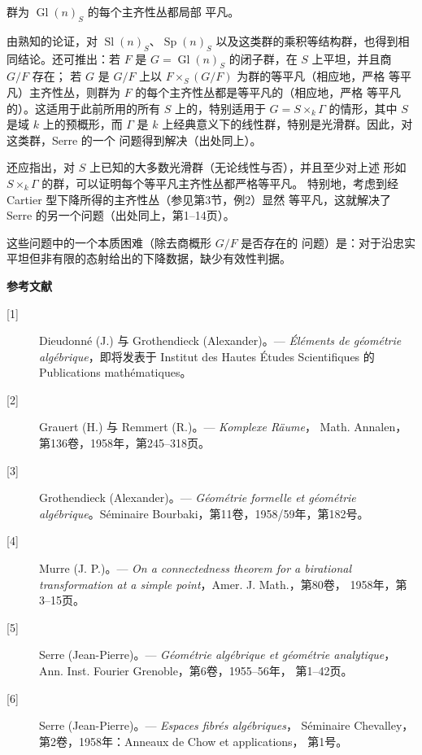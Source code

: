  群为 $\operatorname{Gl}(n)_S$ 的每个主齐性丛都局部
平凡。

由熟知的论证，对 $\operatorname{Sl}(n)_S$、$\operatorname{Sp}(n)_S$
以及这类群的乘积等结构群，也得到相同结论。还可推出：若 $F$ 是
$G=\operatorname{Gl}(n)_S$ 的闭子群，在 $S$ 上平坦，并且商 $G/F$ 存在；
若 $G$ 是 $G/F$ 上以 $F\times_S(G/F)$ 为群的等平凡（相应地，严格
等平凡）主齐性丛，则群为 $F$ 的每个主齐性丛都是等平凡的（相应地，严格
等平凡的）。这适用于此前所用的所有 $S$ 上的，特别适用于
$G=S\times_k\Gamma$ 的情形，其中 $S$ 是域 $k$ 上的预概形，而 $\Gamma$
是 $k$ 上经典意义下的线性群，特别是光滑群。因此，对这类群，Serre 的一个
问题得到解决（出处同上）。

还应指出，对 $S$ 上已知的大多数光滑群（无论线性与否），并且至少对上述
形如 $S\times_k\Gamma$ 的群，可以证明每个等平凡主齐性丛都严格等平凡。
特别地，考虑到经 Cartier 型下降所得的主齐性丛（参见第3节，例2）显然
等平凡，这就解决了 Serre 的另一个问题（出处同上，第1--14页）。

 这些问题中的一个本质困难（除去商概形 $G/F$ 是否存在的
问题）是：对于沿忠实平坦但非有限的态射给出的下降数据，缺少有效性判据。

\begin{center}
  \textbf{参考文献}
\end{center}

\begin{description}
  \item[{[1]}] Dieudonné (J.) 与 Grothendieck (Alexander)。---
    \emph{Éléments de géométrie algébrique}，即将发表于 Institut des
    Hautes Études Scientifiques 的 Publications mathématiques。
  \item[{[2]}] Grauert (H.) 与 Remmert (R.)。--- \emph{Komplexe Räume}，
    Math. Annalen，第136卷，1958年，第245--318页。
  \item[{[3]}] Grothendieck (Alexander)。--- \emph{Géométrie formelle et
    géométrie algébrique}。Séminaire Bourbaki，第11卷，1958/59年，第182号。
  \item[{[4]}] Murre (J. P.)。--- \emph{On a connectedness theorem for a
    birational transformation at a simple point}，Amer. J. Math.，第80卷，
    1958年，第3--15页。
  \item[{[5]}] Serre (Jean-Pierre)。--- \emph{Géométrie algébrique et
    géométrie analytique}，Ann. Inst. Fourier Grenoble，第6卷，1955--56年，
    第1--42页。
  \item[{[6]}] Serre (Jean-Pierre)。--- \emph{Espaces fibrés algébriques}，
    Séminaire Chevalley，第2卷，1958年：Anneaux de Chow et applications，
    第1号。
\end{description}
